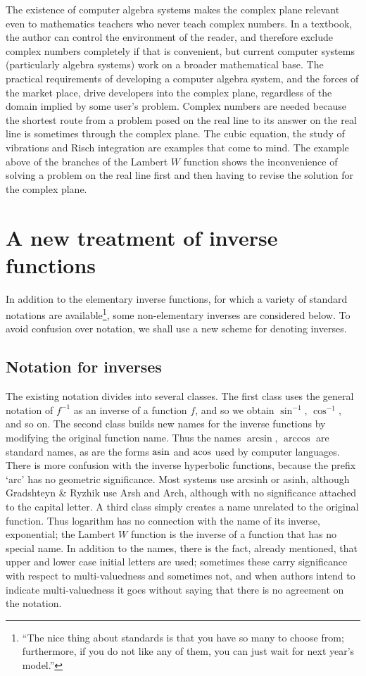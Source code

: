 \documentclass{article}
\newcommand{\asin}{ \mathop {\rm asin}\nolimits}
\newcommand{\acos}{ \mathop {\rm acos}\nolimits}
\begin{document}
The existence of computer algebra systems makes the complex plane relevant even to mathematics
teachers who never teach complex numbers.
In a textbook, the author can control the environment of the reader,
and therefore exclude complex numbers completely if that is convenient,
but current computer systems (particularly algebra systems) work on a broader mathematical base.
The practical requirements of developing a computer algebra system, and the forces of
the market place, drive developers into the complex plane,
regardless of the domain implied by some user's problem.
Complex numbers are needed because the shortest route from a problem
posed on the real line to its answer on the real line is sometimes through the complex plane.
The cubic equation, the study of vibrations and Risch integration are examples
that come to mind.
The example above of the branches of the Lambert $W$ function shows the inconvenience
of solving a problem on the real line first and then having to revise the solution for the
complex plane.

\section{A new treatment of inverse functions}
In addition to the elementary inverse functions, for which a variety of standard notations
are available\footnote{
``The nice thing about standards is that you have so many to choose from; furthermore,
if you do not like any of them, you
can just wait for next year's model.''\cite[p. 168]{Tanenbaum:1981:CN}},
some non-elementary inverses are considered below.
To avoid confusion over notation, we shall use a new scheme for denoting inverses.
\subsection{Notation for inverses}
The existing notation divides into several classes.
The first class uses the general notation
of $f^{-1}$ as an inverse of a function $f$, and so we obtain $\sin^{-1}$, $\cos^{-1}$,
and so on.
The second class builds new names for the inverse functions by modifying
the original function name.
Thus the names $\arcsin$, $\arccos$ are standard names, as are the forms
$\asin$ and $\acos$ used by computer languages.
There is more confusion with the inverse hyperbolic functions,
because the prefix `arc' has no geometric significance. Most systems use
arcsinh or asinh, although Gradshteyn \& Ryzhik \cite{Gradshteyn:1980:Tables}
use Arsh and Arch, although with no significance attached to the capital letter.
A third class simply creates a name unrelated to the original function.
Thus logarithm has no connection with the name of its inverse, exponential;
the Lambert $W$ function is the inverse of a function that has no special name.
In addition to the names, there is the fact, already mentioned, that
upper and lower case initial letters are used;
sometimes these carry significance with respect to
multi-valuedness and sometimes not, and when authors intend to indicate multi-valuedness
it goes without saying that there is no agreement on the notation.
\end{document}
